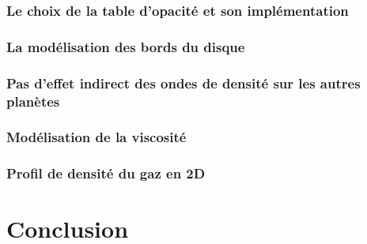 \documentclass[a4paper,twoside]{book}
\begin{document}
\subsection{Le choix de la table d'opacité et son implémentation}

\subsection{La modélisation des bords du disque}

\subsection{Pas d'effet indirect des ondes de densité sur les autres planètes}

\subsection{Modélisation de la viscosité}

\subsection{Profil de densité du gaz en 2D}

\chapter{Conclusion}
\end{document}
